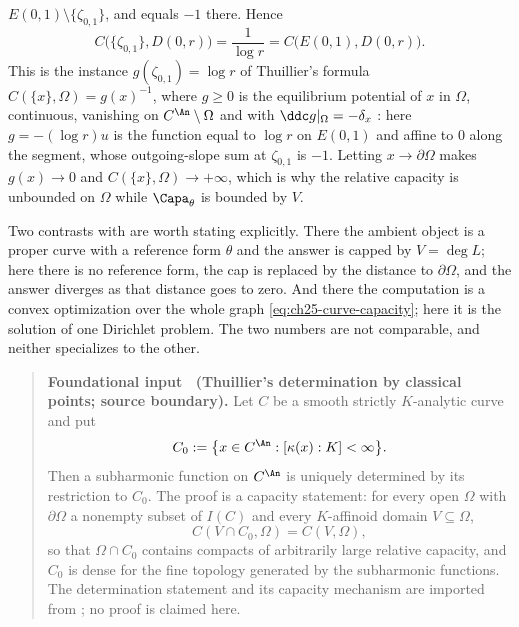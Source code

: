 \begin{example}
\(E(0,1)\setminus\{\zeta_{0,1}\}\), and equals \(-1\) there.  Hence
\[
 C\bigl(\{\zeta_{0,1}\},D(0,r)\bigr)=\frac1{\log r}
 =C\bigl(E(0,1),D(0,r)\bigr).
\]
This is the instance \(g(\zeta_{0,1})=\log r\) of Thuillier's formula
\(C(\{x\},\Omega)=g(x)^{-1}\), where \(g\geq0\) is the equilibrium
potential of \(x\) in \(\Omega\), continuous, vanishing on
\(C^{\An}\setminus\Omega\) and with \(\ddc g|_\Omega=-\delta_x\)
\cite[Lemme~3.6.28]{Thu05}: here \(g=-(\log r)u\) is the function
equal to \(\log r\) on \(E(0,1)\) and affine to \(0\) along the segment, whose
outgoing-slope sum at \(\zeta_{0,1}\) is \(-1\).  Letting \(x\to\partial\Omega\)
makes \(g(x)\to0\) and \(C(\{x\},\Omega)\to+\infty\), which is why the
relative capacity is unbounded on \(\Omega\) while \(\Capa_\theta\) is
bounded by \(V\).

Two contrasts with  are worth stating
explicitly.  There the ambient object is a proper curve with a reference
form \(\theta\) and the answer is capped by \(V=\deg L\); here there is no
reference form, the cap is replaced by the distance to \(\partial\Omega\),
and the answer diverges as that distance goes to zero.  And there the
computation is a convex optimization over the whole graph
\eqref{eq:ch25-curve-capacity}; here it is the solution of one Dirichlet
problem.  The two numbers are not comparable, and neither specializes to the
other.
\end{example}

\label{thm:ch25-thuillier-classical-points}
\begin{quote}
\textbf{Foundational input \thetheorem\ (Thuillier's determination by
classical points; source boundary).}
Let \(C\) be a smooth strictly \(K\)-analytic curve and put
\[
 C_0:=\bigl\{x\in C^{\An}:[\kappa(x):K]<\infty\bigr\}.
\]
Then a subharmonic function on \(C^{\An}\) is uniquely determined by its
restriction to \(C_0\).  The proof is a capacity statement: for every open
\(\Omega\) with \(\partial\Omega\) a nonempty subset of \(I(C)\) and every
\(K\)-affinoid domain \(V\subseteq\Omega\),
\[
 C(V\cap C_0,\Omega)=C(V,\Omega),
\]
so that \(\Omega\cap C_0\) contains compacts of arbitrarily large relative
capacity, and \(C_0\) is dense for the fine topology generated by the
subharmonic functions.
The determination statement and its capacity mechanism are imported from
\cite[Th\'eor\`eme~3.6.26 and Proposition~3.6.29]{Thu05}; no proof is
claimed here.
\end{quote}

